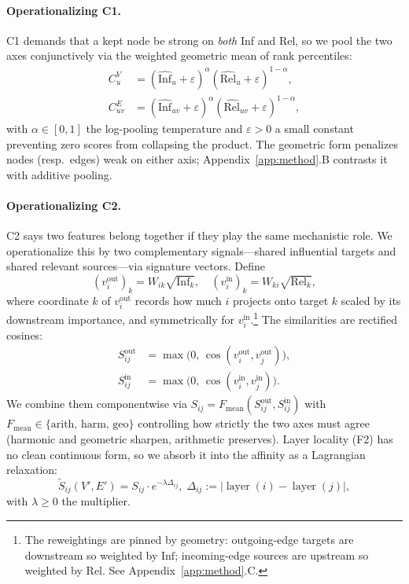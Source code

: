\documentclass[table, 11pt]{article}
\DeclareMathOperator{\layer}{layer}
\begin{document}
\paragraph{Operationalizing C1.}
C1 demands that a kept node be strong on \emph{both} Inf and Rel,
so we pool the two axes conjunctively via the weighted geometric
mean of rank percentiles:
\begin{align}
C^V_u    &= (\widehat{\text{Inf}}_u    + \varepsilon)^\alpha
            (\widehat{\text{Rel}}_u    + \varepsilon)^{1-\alpha},
            \label{eq:CV}\\
C^E_{uv} &= (\widehat{\text{Inf}}_{uv} + \varepsilon)^\alpha
            (\widehat{\text{Rel}}_{uv} + \varepsilon)^{1-\alpha},
            \label{eq:CE}
\end{align}
with $\alpha \in [0,1]$ the log-pooling temperature and
$\varepsilon > 0$ a small constant preventing zero scores from
collapsing the product. The geometric form penalizes nodes (resp.\
edges) weak on either axis; Appendix~\ref{app:method}.B contrasts it
with additive pooling.

\paragraph{Operationalizing C2.}
C2 says two features belong together if they play the same
mechanistic role. We operationalize this by two complementary
signals---shared influential targets and shared relevant
sources---via signature vectors. Define
\begin{equation}
(v_i^{\text{out}})_k = W_{ik} \sqrt{\text{Inf}_k}, \quad
(v_i^{\text{in}})_k  = W_{ki} \sqrt{\text{Rel}_k},
\label{eq:signatures}
\end{equation}
where coordinate $k$ of $v_i^{\text{out}}$ records how much $i$
projects onto target $k$ scaled by its downstream importance, and
symmetrically for $v_i^{\text{in}}$.\footnote{The reweightings are
pinned by geometry: outgoing-edge targets are downstream so weighted
by $\text{Inf}$; incoming-edge sources are upstream so weighted by
$\text{Rel}$. See Appendix~\ref{app:method}.C.} The similarities are
rectified cosines:
\begin{equation}
\begin{aligned}
S^{\text{out}}_{ij} &= \max\!\bigl(0,\, \cos(v_i^{\text{out}}, v_j^{\text{out}})\bigr), \\
S^{\text{in}}_{ij}  &= \max\!\bigl(0,\, \cos(v_i^{\text{in}},  v_j^{\text{in}})\bigr).
\end{aligned}
\label{eq:Sout-Sin}
\end{equation}
We combine them componentwise via
$S_{ij} = F_{\text{mean}}(S^{\text{out}}_{ij}, S^{\text{in}}_{ij})$
with $F_{\text{mean}} \in \{\text{arith, harm, geo}\}$ controlling
how strictly the two axes must agree (harmonic and geometric
sharpen, arithmetic preserves). Layer locality (F2) has no clean
continuous form, so we absorb it into the affinity as a Lagrangian
relaxation:
\begin{equation}
\tilde S_{ij}(V', E') = S_{ij} \cdot e^{-\lambda \Delta_{ij}}, \;
\Delta_{ij} := |\layer(i) - \layer(j)|,
\label{eq:Stilde}
\end{equation}
with $\lambda \ge 0$ the multiplier.
\end{document}

